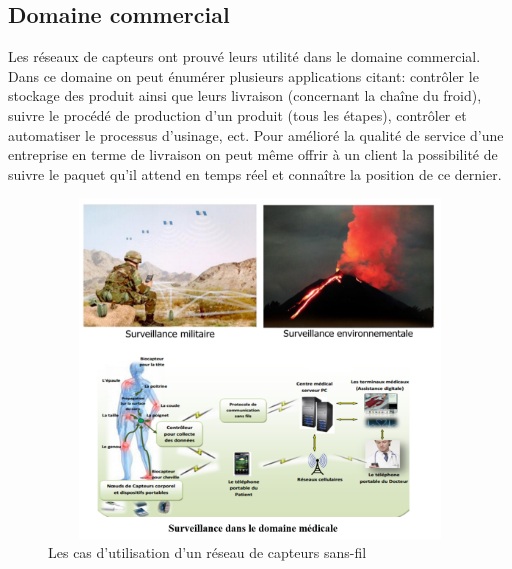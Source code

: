 \subsection{Domaine commercial}
Les réseaux de capteurs ont prouvé leurs utilité dans le domaine commercial. Dans ce 	domaine on peut énumérer plusieurs applications citant: contrôler le stockage des produit 	ainsi que leurs livraison (concernant la chaîne du froid), suivre le procédé de production 	d’un produit (tous les étapes), contrôler et automatiser le processus d’usinage, ect. Pour 	amélioré la qualité de service d’une entreprise en terme de livraison on peut même offrir à 	un client la possibilité de suivre le  paquet qu’il attend en temps réel et connaître la position 	de ce dernier.

\begin{figure}[H]
	\centering
	\includegraphics[width=14cm,height=9cm]{Chap1/7.png}
	\caption{Les cas d’utilisation d’un réseau de capteurs sans-fil}
	\label{fig:CURCSF}
\end{figure}



